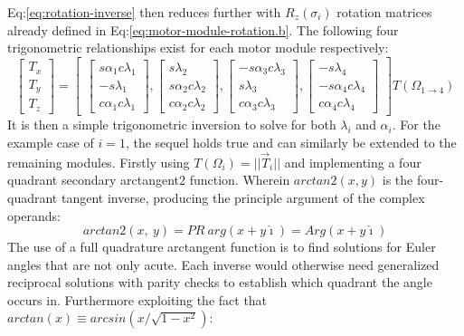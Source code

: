 Eq:\ref{eq:rotation-inverse} then reduces further with $R_z(\sigma_i)$ rotation matrices already defined in Eq:\ref{eq:motor-module-rotation.b}. The following four trigonometric relationships exist for each motor module respectively:
\begin{equation}
\begin{bmatrix}
T_x\\
T_y\\
T_z
\end{bmatrix}
=
\begin{bmatrix}
\begin{bmatrix}
s\alpha_1 c\lambda_1\\
-s\lambda_1 \\
c\alpha_1 c\lambda_1
\end{bmatrix}
,
\begin{bmatrix}
s\lambda_2\\
s\alpha_2 c\lambda_2\\
c\alpha_2 c\lambda_2
\end{bmatrix}
,
\begin{bmatrix}
-s\alpha_3 c\lambda_3\\
s\lambda_3\\
c\alpha_3 c\lambda_3
\end{bmatrix}
,
\begin{bmatrix}
-s\lambda_4\\
-s\alpha_4 c\lambda_4\\
c\alpha_4 c\lambda_4
\end{bmatrix}
\end{bmatrix}T(\Omega_{1\rightarrow 4})
\end{equation}
It is then a simple trigonometric inversion to solve for both $\lambda_i$ and $\alpha_i$. For the example case of $i=1$, the sequel holds true and can similarly be extended to the remaining modules. Firstly using $T(\Omega_i)=||\vec{T}_i||$ and implementing a four quadrant secondary arctangent2 function. Wherein $arctan2(x,y)$ is the four-quadrant tangent inverse\cite{atan2}, producing the principle argument of the complex operands:
\begin{equation}
arctan2(x,~y)=PR~arg(x+y\hat{\imath})=Arg(x+y\hat{\imath})
\end{equation}
The use of a full quadrature arctangent function is to find solutions for Euler angles that are not only acute. Each inverse would otherwise need generalized reciprocal solutions with parity checks to establish which quadrant the angle occurs in. Furthermore exploiting the fact that $arctan(x)\equiv arcsin(x/\sqrt{1-x^2})$:
